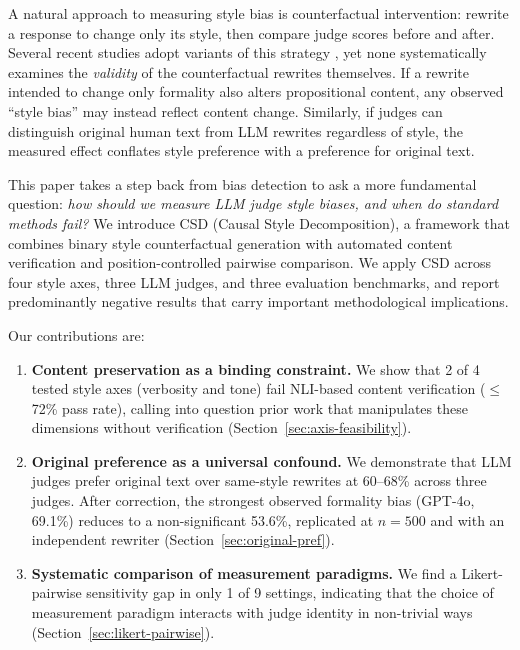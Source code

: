 \documentclass[11pt,a4paper]{article}
\begin{document}
A natural approach to measuring style bias is counterfactual intervention: rewrite a response to change only its style, then compare judge scores before and after.
Several recent studies adopt variants of this strategy \citep{casse2026,sosbench2025}, yet none systematically examines the \emph{validity} of the counterfactual rewrites themselves.
If a rewrite intended to change only formality also alters propositional content, any observed ``style bias'' may instead reflect content change.
Similarly, if judges can distinguish original human text from LLM rewrites regardless of style, the measured effect conflates style preference with a preference for original text.

This paper takes a step back from bias detection to ask a more fundamental question: \emph{how should we measure LLM judge style biases, and when do standard methods fail?}
We introduce CSD (Causal Style Decomposition), a framework that combines binary style counterfactual generation with automated content verification and position-controlled pairwise comparison.
We apply CSD across four style axes, three LLM judges, and three evaluation benchmarks, and report predominantly negative results that carry important methodological implications.

Our contributions are:
\begin{enumerate}[leftmargin=*,itemsep=2pt]
\item \textbf{Content preservation as a binding constraint.} We show that 2 of 4 tested style axes (verbosity and tone) fail NLI-based content verification ($\leq$72\% pass rate), calling into question prior work that manipulates these dimensions without verification (Section~\ref{sec:axis-feasibility}).
\item \textbf{Original preference as a universal confound.} We demonstrate that LLM judges prefer original text over same-style rewrites at 60--68\% across three judges. After correction, the strongest observed formality bias (GPT-4o, 69.1\%) reduces to a non-significant 53.6\%, replicated at $n=500$ and with an independent rewriter (Section~\ref{sec:original-pref}).
\item \textbf{Systematic comparison of measurement paradigms.} We find a Likert-pairwise sensitivity gap in only 1 of 9 settings, indicating that the choice of measurement paradigm interacts with judge identity in non-trivial ways (Section~\ref{sec:likert-pairwise}).
\end{enumerate}

\end{document}
